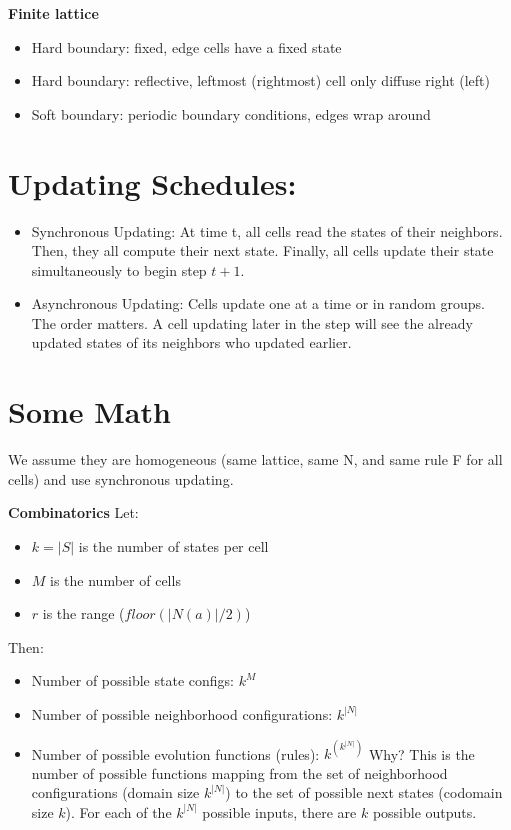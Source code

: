 \textbf{Finite lattice}
\begin{itemize}
    \item Hard boundary: fixed, edge cells have a fixed state
    \item Hard boundary: reflective, leftmost (rightmost) cell only diffuse right (left)
    \item Soft boundary: periodic boundary conditions, edges wrap around
\end{itemize}

\section*{Updating Schedules:}
\begin{itemize}
    \item Synchronous Updating: At time t, all cells read the states of 
    their neighbors. Then, they all compute their next state. Finally, all cells update their state simultaneously to begin step $t+1$.
    \item Asynchronous Updating: Cells update one at a time or in random groups. The order matters. A cell updating later in the step will see the already updated states of its neighbors who updated earlier.
\end{itemize}

\section*{Some Math}
We assume they are homogeneous (same lattice, same N, and same rule F for all cells)
and use synchronous updating.

\textbf{Combinatorics}
Let: 
\begin{itemize}
    \item $k = |S|$ is the number of states per cell 
    \item $M$ is the number of cells 
    \item $r$ is the range ($floor(|N(a)|/2)$)
\end{itemize}

Then: 
\begin{itemize}
    \item Number of possible state configs: $k^{M}$
    \item Number of possible neighborhood configurations: $k^{|N|}$
    \item Number of possible evolution functions (rules): $k^{\left(k^{|N|}\right)}$
    Why? This is the number of possible functions mapping from the set of neighborhood configurations (domain size $k^{|N|}$) to the set of possible next states (codomain size $k$). For each of the $k^{|N|}$ possible inputs, there are $k$ possible outputs.
\end{itemize}

